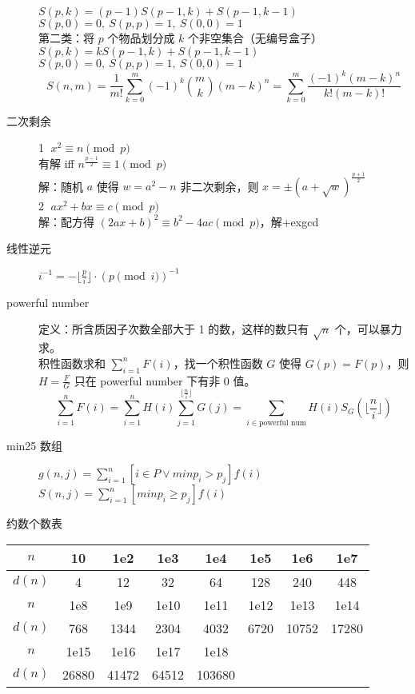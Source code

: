 \documentclass{article}
\begin{document}
\begin{multicols}{2}
\begin{description}
      $S(p,k) = (p-1)S(p-1,k) + S(p-1,k-1)$ \\
      $S(p,0) = 0, \ S(p,p) = 1, \ S(0,0) = 1$ \\
      第二类：将 $p$ 个物品划分成 $k$ 个非空集合（无编号盒子） \\
      $S(p,k) = kS(p-1,k) + S(p-1,k-1)$ \\
      $S(p,0) = 0,\ S(p,p) = 1,\ S(0,0) = 1$ \\
      $$
      S(n,m) = \frac{1}{m!} \sum_{k=0}^m (-1)^k \binom{m}{k} (m-k)^n = \sum_{k=0}^m \frac{(-1)^k (m-k)^n}{k!(m-k)!}
      $$
  \item[二次剩余] \textcircled{1} $x^2 \equiv n \pmod p$ \\
      有解 iff $n^{\frac{p-1}{2}} \equiv 1 \pmod p$ \\
      解：随机 $a$ 使得 $w = a^2 - n$ 非二次剩余，则 $x = \pm (a+ \sqrt w)^{\frac{p+1}{2}}$ \\
      \textcircled{2} $ax^2 + bx \equiv c \pmod p$ \\
      解：配方得 $(2ax+b)^2 \equiv b^2 - 4ac \pmod p$，解+exgcd
  \item[线性逆元] $i^{-1} = - \lfloor \frac{p}{i} \rfloor \cdot (p \pmod i)^{-1}$
  \item[powerful number] 定义：所含质因子次数全部大于 1 的数，这样的数只有 $\sqrt n$ 个，可以暴力求。\\
      积性函数求和 $\sum_{i=1}^n F(i)$，找一个积性函数 $G$ 使得 $G(p) = F(p)$，则 $H = \frac FG$ 只在 powerful number 下有非 0 值。
      $$
      \sum_{i=1}^n F(i) = \sum_{i=1}^n H(i) \sum_{j=1}^{\lfloor \frac ni \rfloor} G(j) = \sum_{i \in \text{powerful num}} H(i) S_G(\lfloor \frac ni \rfloor)
      $$
  \item[min25 数组] $g(n,j) = \sum_{i=1}^n [i \in P \lor minp_i > p_j] f(i)$ \\
      $S(n,j) = \sum_{i=1}^n [minp_i \ge p_j] f(i)$
\end{description}

约数个数表

\begin{tabular}{@{}|c|ccccccc|}
  \hline
  $n$ & 10 & 1e2 & 1e3 & 1e4 & 1e5 & 1e6 & 1e7 \\
  \hline
  $d(n)$ & 4 & 12 & 32 & 64 & 128 & 240 & 448 \\
  \hline
  $n$ & 1e8 & 1e9 & 1e10 & 1e11 & 1e12 & 1e13 & 1e14 \\
  \hline
  $d(n)$ & 768 & 1344 & 2304 & 4032 & 6720 & 10752 & 17280 \\
  \hline
  $n$ & 1e15 & 1e16 & 1e17 & 1e18 &&& \\
  \hline
  $d(n)$ & 26880 & 41472 & 64512 & 103680 &&& \\
  \hline
\end{tabular}


\end{multicols}
\end{document}
